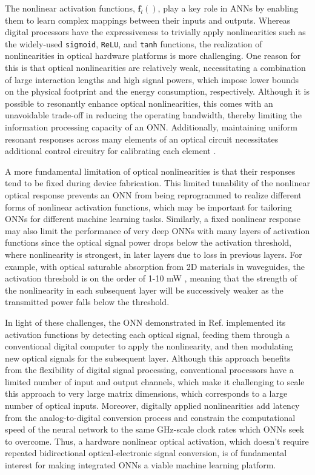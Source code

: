 The nonlinear activation functions, $\mathbf{f}_l()$, play a key role in ANNs by enabling them to learn complex mappings between their inputs and outputs. 
Whereas digital processors have the expressiveness to trivially apply nonlinearities such as the widely-used \texttt{sigmoid}, \texttt{ReLU}, and \texttt{tanh} functions, the realization of nonlinearities in optical hardware platforms is more challenging. 
One reason for this is that optical nonlinearities are relatively weak, necessitating a combination of large interaction lengths and high signal powers, which impose lower bounds on the physical footprint and the energy consumption, respectively. 
Although it is possible to resonantly enhance optical nonlinearities, this comes with an unavoidable trade-off in reducing the operating bandwidth, thereby limiting the information processing capacity of an ONN. 
Additionally, maintaining uniform resonant responses across many elements of an optical circuit necessitates additional control circuitry for calibrating each element \cite{radulaski_thermally_2018}.

A more fundamental limitation of optical nonlinearities is that their responses tend to be fixed during device fabrication. 
This limited tunability of the nonlinear optical response prevents an ONN from being reprogrammed to realize different forms of nonlinear activation functions, which may be important for tailoring ONNs for different machine learning tasks. 
Similarly, a fixed nonlinear response may also limit the performance of very deep ONNs with many layers of activation functions since the optical signal power drops below the activation threshold, where nonlinearity is strongest, in later layers due to loss in previous layers. 
For example, with optical saturable absorption from 2D materials in waveguides, the activation threshold is on the order of 1-10 mW \cite{bao_monolayer_2011, park_monolayer_2015, jiang_low-dimensional_2018}, meaning that the strength of the nonlinearity in each subsequent layer will be successively weaker as the transmitted power falls below the threshold.

In light of these challenges, the ONN demonstrated in Ref.  implemented its activation functions by detecting each optical signal, feeding them through a conventional digital computer to apply the nonlinearity, and then modulating new optical signals for the subsequent layer. 
Although this approach benefits from the flexibility of digital signal processing, conventional processors have a limited number of input and output channels, which make it challenging to scale this approach to very large matrix dimensions, which corresponds to a large number of optical inputs. 
Moreover, digitally applied nonlinearities add latency from the analog-to-digital conversion process and constrain the computational speed of the neural network to the same GHz-scale clock rates which ONNs seek to overcome. 
Thus, a hardware nonlinear optical activation, which doesn't require repeated bidirectional optical-electronic signal conversion, is of fundamental interest for making integrated ONNs a viable machine learning platform.

